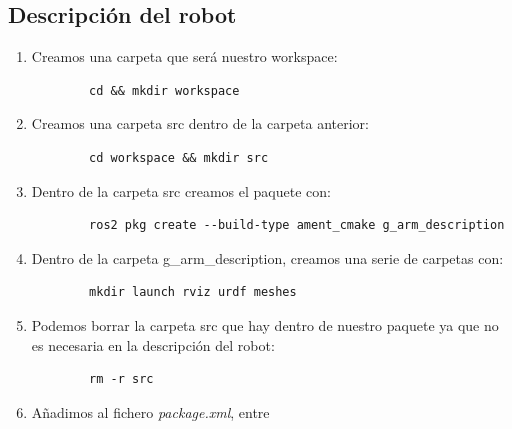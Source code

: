 \subsection{Descripción del robot}
\begin{enumerate}
    \item Creamos una carpeta que será nuestro workspace:
    \begin{verbatim}
        cd && mkdir workspace
    \end{verbatim}
    
    \item Creamos una carpeta src dentro de la carpeta anterior:
    \begin{verbatim}
        cd workspace && mkdir src
    \end{verbatim}
    
    \item Dentro de la carpeta src creamos el paquete con:
    
    \begin{verbatim}
        ros2 pkg create --build-type ament_cmake g_arm_description
    \end{verbatim}
    
    \item Dentro de la carpeta g\_arm\_description, creamos una serie de carpetas con:
    \begin{verbatim}
        mkdir launch rviz urdf meshes
    \end{verbatim}
    
    \item Podemos borrar la carpeta src que hay dentro de nuestro paquete ya que no es necesaria en la descripción del robot:
    \begin{verbatim}
        rm -r src
    \end{verbatim}
    
    \item Añadimos al fichero \textit{package.xml}, entre  
    

\end{enumerate}
